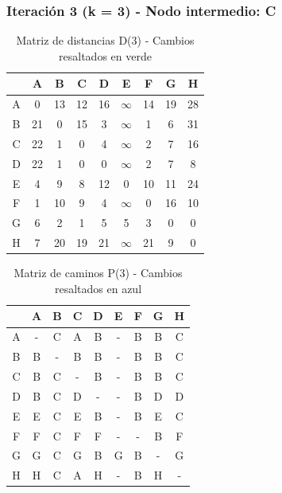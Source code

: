 \documentclass[12pt]{article}
\begin{document}
\clearpage
\subsubsection{Iteración 3 (k = 3) - Nodo intermedio: C}
\begin{table}[h!]
\centering
\begin{tabular}{|c|c|c|c|c|c|c|c|c|}
\hline
 & A & B & C & D & E & F & G & H \\\hline
A & 0 & \cellcolor{lightgreen} 13 & 12 & \cellcolor{lightgreen} 16 & $\infty$ & \cellcolor{lightgreen} 14 & \cellcolor{lightgreen} 19 & \cellcolor{lightgreen} 28 \\\hline
B & 21 & 0 & 15 & 3 & $\infty$ & 1 & 6 & \cellcolor{lightgreen} 31 \\\hline
C & 22 & 1 & 0 & 4 & $\infty$ & 2 & 7 & 16 \\\hline
D & \cellcolor{lightgreen} 22 & \cellcolor{lightgreen} 1 & 0 & 0 & $\infty$ & \cellcolor{lightgreen} 2 & 7 & 8 \\\hline
E & 4 & \cellcolor{lightgreen} 9 & 8 & \cellcolor{lightgreen} 12 & 0 & \cellcolor{lightgreen} 10 & 11 & \cellcolor{lightgreen} 24 \\\hline
F & 1 & \cellcolor{lightgreen} 10 & 9 & 4 & $\infty$ & 0 & \cellcolor{lightgreen} 16 & 10 \\\hline
G & 6 & \cellcolor{lightgreen} 2 & 1 & \cellcolor{lightgreen} 5 & 5 & \cellcolor{lightgreen} 3 & 0 & 0 \\\hline
H & 7 & \cellcolor{lightgreen} 20 & 19 & 21 & $\infty$ & \cellcolor{lightgreen} 21 & 9 & 0 \\\hline
\end{tabular}
\caption{Matriz de distancias D(3) - Cambios resaltados en verde}
\end{table}

\begin{table}[h!]
\centering
\begin{tabular}{|c|c|c|c|c|c|c|c|c|}
\hline
 & A & B & C & D & E & F & G & H \\\hline
A & - & \cellcolor{lightblue} C & A & \cellcolor{lightblue} B & - & \cellcolor{lightblue} B & \cellcolor{lightblue} B & \cellcolor{lightblue} C \\\hline
B & B & - & B & B & - & B & B & \cellcolor{lightblue} C \\\hline
C & B & C & - & B & - & B & B & C \\\hline
D & B & \cellcolor{lightblue} C & D & - & - & B & D & D \\\hline
E & E & \cellcolor{lightblue} C & E & \cellcolor{lightblue} B & - & \cellcolor{lightblue} B & E & \cellcolor{lightblue} C \\\hline
F & F & \cellcolor{lightblue} C & F & F & - & - & \cellcolor{lightblue} B & F \\\hline
G & G & \cellcolor{lightblue} C & G & \cellcolor{lightblue} B & G & B & - & G \\\hline
H & H & \cellcolor{lightblue} C & A & H & - & \cellcolor{lightblue} B & H & - \\\hline
\end{tabular}
\caption{Matriz de caminos P(3) - Cambios resaltados en azul}
\end{table}
\end{document}
